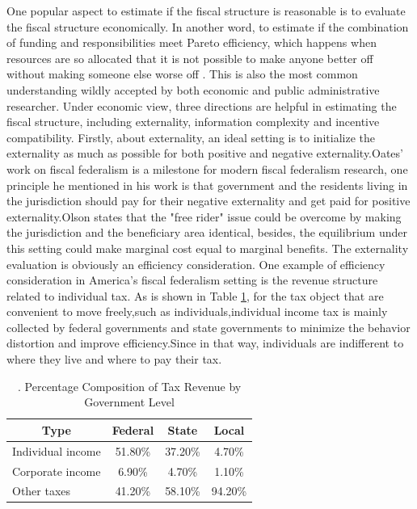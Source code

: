 One popular aspect to estimate if the  fiscal structure is reasonable is to evaluate the fiscal structure economically. In another word, to estimate if the combination of funding and responsibilities meet Pareto efficiency, which happens when resources are so allocated that it is not possible to make anyone better off without making someone else worse off \cite{pareto2014manual}. This is also the most common understanding wildly accepted by both economic and public administrative researcher.  Under economic view, three directions are helpful in estimating the fiscal structure, including externality, information complexity and incentive compatibility. Firstly, about externality, an ideal setting is to initialize the externality as much as possible for both positive and negative externality.Oates' \cite{oates1972fiscal} work on fiscal federalism is a milestone for modern fiscal federalism research, one principle he mentioned in his work is that government and the residents living in the jurisdiction should pay for their negative externality and get paid for positive externality.Olson \cite{olson1993dictatorship} states that the "free rider" issue could be overcome by making the jurisdiction and the  beneficiary area identical, besides, the equilibrium under this setting could make marginal cost equal to marginal benefits. The externality evaluation is obviously an efficiency consideration. One example of efficiency consideration in America's fiscal federalism setting is the revenue structure related to individual tax. As is shown in Table \ref*{Table 2.2}, for the tax object that are convenient to move freely,such as individuals,individual income tax is mainly collected by federal governments and state governments to minimize the behavior distortion and improve efficiency.Since in that way, individuals are indifferent to where they live and where to pay their tax.

\begin{table}[htbp]
    \centering
    \caption{. Percentage Composition of Tax Revenue by Government Level}
    \begin{tabular}{lccc}
        \toprule
        \multicolumn{1}{c}{Type} & Federal & State   & Local   \\
        \midrule
        Individual income        & 51.80\% & 37.20\% & 4.70\%  \\
        Corporate income         & 6.90\%  & 4.70\%  & 1.10\%  \\
        Other taxes              & 41.20\% & 58.10\% & 94.20\% \\
        \bottomrule
    \end{tabular}%
    \label{Table 2.2}%
\end{table}%


